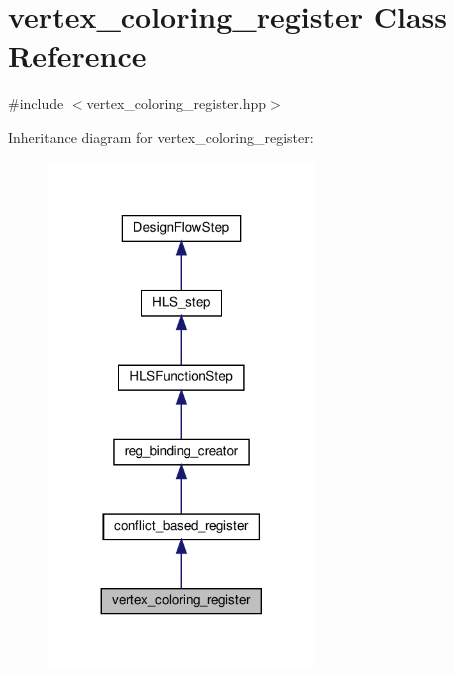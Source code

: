 \hypertarget{classvertex__coloring__register}{}\section{vertex\+\_\+coloring\+\_\+register Class Reference}
\label{classvertex__coloring__register}


{\ttfamily \#include $<$vertex\+\_\+coloring\+\_\+register.\+hpp$>$}



Inheritance diagram for vertex\+\_\+coloring\+\_\+register\+:
\nopagebreak
\begin{figure}[H]
\begin{center}
\leavevmode
\includegraphics[width=200pt]{d0/d3c/classvertex__coloring__register__inherit__graph}
\end{center}
\end{figure}


